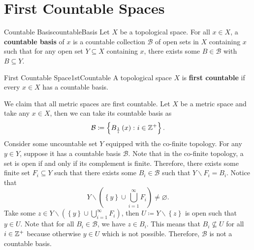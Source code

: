 \documentclass[math]{amznotes}
\theoremstyle{remark}
\begin{document}
\section{First Countable Spaces}
\begin{dfnbox}{Countable Basis}{countableBasis}
    Let $X$ be a topological space. For all $x \in X$, a {\color{red} \textbf{countable basis}} of $x$ is a countable collection $\mathcal{B}$ of open sets in $X$ containing $x$ such that for any open set $Y \subseteq X$ containing $x$, there exists some $B \in \mathcal{B}$ with $B \subseteq Y$. 
\end{dfnbox}
\begin{dfnbox}{First Countable Space}{1stCountable}
    A topological space $X$ is {\color{red} \textbf{first countable}} if every $x \in X$ has a countable basis.
\end{dfnbox}
We claim that all metric spaces are first countable. Let $X$ be a metric space and take any $x \in X$, then we can take its countable basis as 
\begin{equation*}
    \mathcal{B} \coloneqq \left\{B_{\frac{1}{i}}\left(x\right) \colon i \in \mathbb{Z}^+\right\}.
\end{equation*}
Consider some uncountable set $Y$ equipped with the co-finite topology. For any $y \in Y$, suppose it has a countable basis $\mathcal{B}$. Note that in the co-finite topology, a set is open if and only if its complement is finite. Therefore, there exists some finite set $F_i \subseteq Y$ such that there exists some $B_i \in \mathcal{B}$ such that $Y \backslash F_i = B_i$. Notice that 
\begin{equation*}
    Y \backslash \left(\left\{y\right\} \cup \bigcup_{i = 1}^{\infty}F_i\right) \neq \varnothing.
\end{equation*}
Take some $z \in Y \backslash \left(\left\{y\right\} \cup \bigcup_{i = 1}^{\infty}F_i\right)$, then $U \coloneqq Y \backslash \left\{z\right\}$ is open such that $y \in U$. Note that for all $B_i \in \mathcal{B}$, we have $z \in B_i$. This means that $B_i \not\subseteq U$ for all $i \in \mathbb{Z}^+$ because otherwise $y \in U$ which is not possible. Therefore, $\mathcal{B}$ is not a countable basis.
\end{document}
